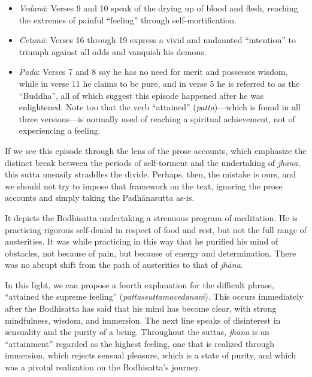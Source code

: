 \documentclass[12pt,openany]{book}%
\begin{document}
\begin{itemize}%
\item \textit{\textsanskrit{Vedanā}}: Verses 9 and 10 speak of the drying up of blood and flesh, reaching the extremes of painful “feeling” through self-mortification.%
\item \textit{\textsanskrit{Cetanā}}: Verses 16 through 19 express a vivid and undaunted “intention” to triumph against all odds and vanquish his demons.%
\item \textit{Pada}: Verses 7 and 8 say he has no need for merit and possesses wisdom, while in verse 11 he claims to be pure, and in verse 5 he is referred to as the “Buddha”, all of which suggest this episode happened after he was enlightened. Note too that the verb “attained” (\textit{patta})—which is found in all three versions—is normally used of reaching a spiritual achievement, not of experiencing a feeling.%
\end{itemize}

If we see this episode through the lens of the prose accounts, which emphasize the distinct break between the periods of self-torment and the undertaking of \textit{\textsanskrit{jhāna}}, this sutta uneasily straddles the divide. Perhaps, then, the mistake is ours, and we should not try to impose that framework on the text, ignoring the prose accounts and simply taking the \textsanskrit{Padhānasutta} as-is.

It depicts the Bodhisatta undertaking a strenuous program of meditation. He is practicing rigorous self-denial in respect of food and rest, but not the full range of austerities. It was while practicing in this way that he purified his mind of obstacles, not because of pain, but because of energy and determination. There was no abrupt shift from the path of austerities to that of \textit{\textsanskrit{jhāna}}.

In this light, we can propose a fourth explanation for the difficult phrase, “attained the supreme feeling” (\textit{\textsanskrit{pattassuttamavedanaṁ}}). This occurs immediately after the Bodhisatta has said that his mind has become clear, with strong mindfulness, wisdom, and immersion. The next line speaks of disinterest in sensuality and the purity of a being. Throughout the suttas, \textit{\textsanskrit{jhāna}} is an “attainment” regarded as the highest feeling, one that is realized through immersion, which rejects sensual pleasure, which is a state of purity, and which was a pivotal realization on the Bodhisatta’s journey.
\end{document}
